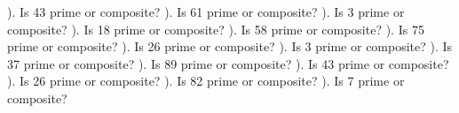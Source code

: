 \documentclass{article}%
\begin{document}
\newline%
). Is 43 prime or composite?%
\newline%
\newline%
). Is 61 prime or composite?%
\newline%
\newline%
). Is 3 prime or composite?%
\newline%
\newline%
). Is 18 prime or composite?%
\newline%
\newline%
). Is 58 prime or composite?%
\newline%
\newline%
). Is 75 prime or composite?%
\newline%
\newline%
). Is 26 prime or composite?%
\newline%
\newline%
). Is 3 prime or composite?%
\newline%
\newline%
). Is 37 prime or composite?%
\newline%
\newline%
). Is 89 prime or composite?%
\newline%
\newline%
). Is 43 prime or composite?%
\newline%
\newline%
). Is 26 prime or composite?%
\newline%
\newline%
). Is 82 prime or composite?%
\newline%
\newline%
). Is 7 prime or composite?%
\newline%
\newline%
\newline%
\end{document}
